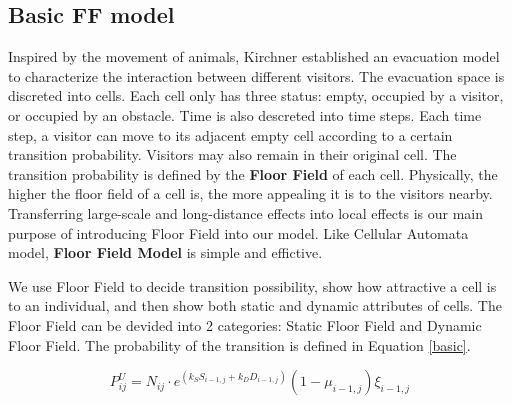 \documentclass{mcmthesis}
\begin{document}
\subsection{Basic FF model}
Inspired by the movement of animals, Kirchner \cite{65} established an evacuation model to characterize the interaction between different visitors. The evacuation space is discreted into cells. Each cell only has three status: empty, occupied by a visitor, or occupied by an obstacle. Time is also descreted into time steps. Each time step, a visitor can move to its adjacent empty cell according to a certain transition probability. Visitors may also remain in their original cell. The transition probability is defined by the \textbf{Floor Field} of each cell. Physically, the higher the floor field of a cell is, the more appealing it is to the visitors nearby. Transferring large-scale and long-distance effects into local effects is our main purpose of introducing Floor Field into our model. Like Cellular Automata model, \textbf{Floor Field Model} is simple and effictive. 

We use Floor Field to decide transition possibility, show how attractive a cell is to an individual, and then show both static and dynamic attributes of cells. The Floor Field can be devided into 2 categories: Static Floor Field and Dynamic Floor Field. The probability of the transition is defined in Equation \eqref{basic}.

\begin{equation}
	P^U_{ij}=N_{ij}\cdot e^{\left(k_SS_{i-1,j}+k_DD_{i-1,j}\right)}\left(1-\mu_{i-1,j}\right)\xi_{i-1,j}
	\label{basic}
\end{equation}
\end{document}
